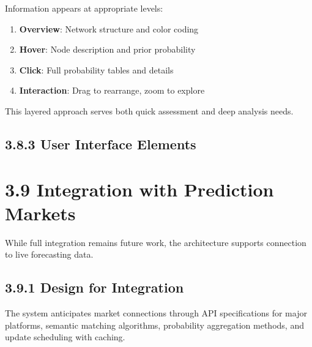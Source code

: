 \documentclass[
  11pt,
  letterpaper,
]{book}
\providecommand{\tightlist}{%
  \setlength{\itemsep}{0pt}\setlength{\parskip}{0pt}}
\begin{document}
Information appears at appropriate levels:

\begin{enumerate}
\def\labelenumi{\arabic{enumi}.}
\tightlist
\item
  \textbf{Overview}: Network structure and color coding
\item
  \textbf{Hover}: Node description and prior probability
\item
  \textbf{Click}: Full probability tables and details
\item
  \textbf{Interaction}: Drag to rearrange, zoom to explore
\end{enumerate}

This layered approach serves both quick assessment and deep analysis
needs.

\subsection*{3.8.3 User Interface Elements}\label{sec-ui-elements}

\section*{3.9 Integration with Prediction
Markets}\label{sec-market-integration}


While full integration remains future work, the architecture supports
connection to live forecasting data.

\subsection*{3.9.1 Design for Integration}\label{sec-integration-design}

\begin{tcolorbox}[enhanced jigsaw, toprule=.15mm, colbacktitle=quarto-callout-note-color!10!white, opacitybacktitle=0.6, leftrule=.75mm, coltitle=black, rightrule=.15mm, opacityback=0, bottomtitle=1mm, title=\textcolor{quarto-callout-note-color}{\faInfo}\hspace{0.5em}{Integration Architecture}, toptitle=1mm, breakable, titlerule=0mm, left=2mm, arc=.35mm, colframe=quarto-callout-note-color-frame, bottomrule=.15mm, colback=white]

The system anticipates market connections through API specifications for
major platforms, semantic matching algorithms, probability aggregation
methods, and update scheduling with caching.

\end{tcolorbox}
\end{document}
